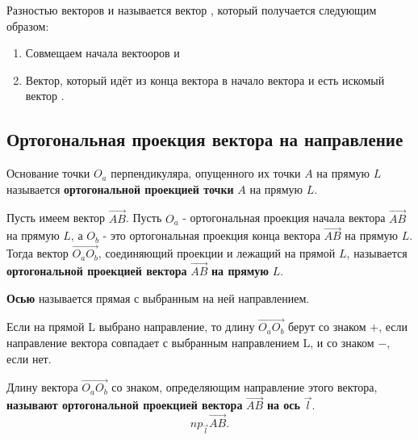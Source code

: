 \begin{definition}
  Разностью векторов  и  называется вектор , который получается следующим образом:
  \begin{enumerate}
    \item Совмещаем начала вектооров  и 
    \item Вектор, который идёт из конца вектора  в начало вектора  и есть искомый вектор . 
  \end{enumerate}
\end{definition}

\subsection{Ортогональная проекция вектора на направление}

\begin{definition}
  Основание точки $O_a$ перпендикуляра, опущенного их точки $A$ на прямую $L$ называется \textbf{ортогональной проекцией точки} $A$ на прямую $L$.
\end{definition}

\begin{definition}
  Пусть имеем вектор $\overrightarrow{AB}$. Пусть $O_a$ - ортогональная проекция начала вектора $\overrightarrow{AB}$ на прямую $L$, а $O_b$ - это ортогональная проекция конца вектора $\overrightarrow{AB}$ на прямую $L$. Тогда вектор $\overrightarrow{O_aO_b}$, соединяющий проекции и лежащий на прямой $L$, называется \textbf{ортогональной проекцией вектора} $\overrightarrow{AB}$ \textbf{на прямую} $L$.
\end{definition}

\begin{definition}
  \textbf{Осью} называется прямая с выбранным на ней направлением.
\end{definition}

Если на прямой L выбрано направление, то длину $\overrightarrow{O_aO_b}$ берут со знаком $+$, если направление вектора совпадает с выбранным направлением L, и со знаком  $-$, если нет.

\begin{definition}
  Длину вектора $\overrightarrow{O_aO_b}$ со знаком, определяющим направление этого вектора, \textbf{называют ортогональной проекцией вектора} $\overrightarrow{AB}$ \textbf{на ось} $\vec{l}$.
  \[
    np_{\vec{l}}\overrightarrow{AB}
  .\] 
\end{definition}

